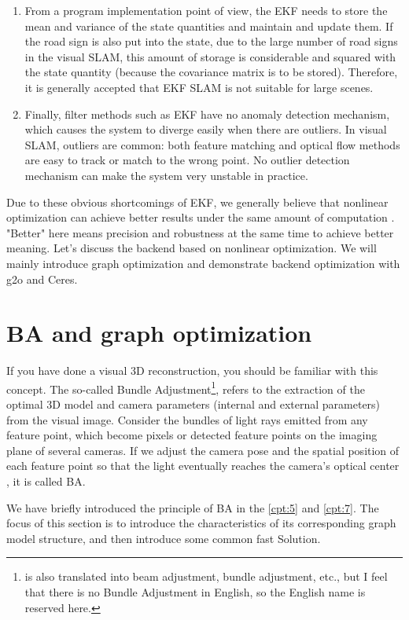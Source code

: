 \begin{enumerate}
\item From a program implementation point of view, the EKF needs to store the mean and variance of the state quantities and maintain and update them. If the road sign is also put into the state, due to the large number of road signs in the visual SLAM, this amount of storage is considerable and squared with the state quantity (because the covariance matrix is ​​to be stored). Therefore, it is generally accepted that EKF SLAM is not suitable for large scenes.

\item Finally, filter methods such as EKF have no anomaly detection mechanism, which causes the system to diverge easily when there are outliers. In visual SLAM, outliers are common: both feature matching and optical flow methods are easy to track or match to the wrong point. No outlier detection mechanism can make the system very unstable in practice.
\end{enumerate}

Due to these obvious shortcomings of EKF, we generally believe that nonlinear optimization can achieve better results under the same amount of computation \textsuperscript{\cite{Strasdat2012}}. "Better" here means precision and robustness at the same time to achieve better meaning. Let's discuss the backend based on nonlinear optimization. We will mainly introduce graph optimization and demonstrate backend optimization with g2o and Ceres.

\section{BA and graph optimization}
If you have done a visual 3D reconstruction, you should be familiar with this concept. The so-called Bundle Adjustment\footnote{ is also translated into beam adjustment, bundle adjustment, etc., but I feel that there is no Bundle Adjustment in English, so the English name is reserved here. }, refers to the extraction of the optimal 3D model and camera parameters (internal and external parameters) from the visual image. Consider the bundles of light rays emitted from any feature point, which become pixels or detected feature points on the imaging plane of several cameras. If we adjust the camera pose and the spatial position of each feature point so that the light eventually reaches the camera's optical center \textsuperscript{\cite{Triggs2000}}, it is called BA.

We have briefly introduced the principle of BA in the \ref{cpt:5} and \ref{cpt:7}. The focus of this section is to introduce the characteristics of its corresponding graph model structure, and then introduce some common fast Solution.

